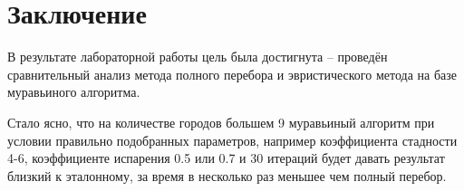 \chapter*{Заключение}
\label{cha:conclusion}
В результате лабораторной работы цель была достигнута -- проведён сравнительный анализ метода полного перебора и эвристического метода на базе муравьиного алгоритма.
\par Стало ясно, что на количестве городов большем 9 муравьиный алгоритм при условии правильно подобранных параметров, например коэффициента стадности 4-6, коэффициенте испарения 0.5 или 0.7 и 30 итераций будет давать результат близкий к эталонному, за время в несколько раз меньшее чем полный перебор.